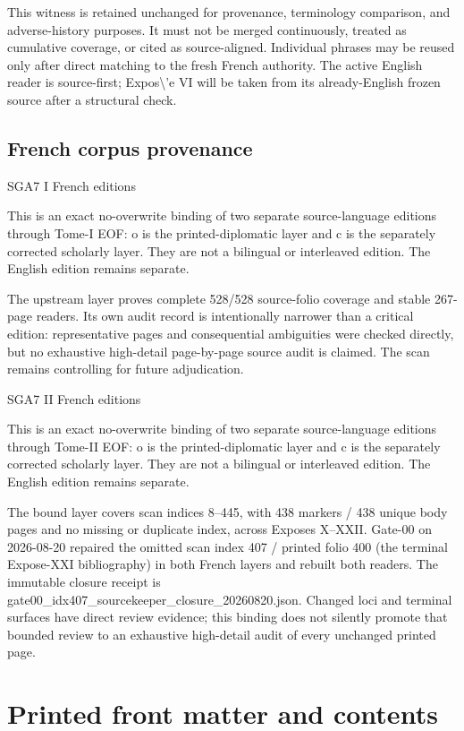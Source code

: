 This witness is retained unchanged for provenance, terminology comparison, and adverse-history purposes. It must not be merged continuously, treated as cumulative coverage, or cited as source-aligned. Individual phrases may be reused only after direct matching to the fresh French authority. The active English reader is source-first; Expos\textbackslash{}'e VI will be taken from its already-English frozen source after a structural check.


\subsection*{French corpus provenance}

SGA7 I French editions

This is an exact no-overwrite binding of two separate source-language editions through Tome-I EOF: o is the printed-diplomatic layer and c is the separately corrected scholarly layer. They are not a bilingual or interleaved edition. The English edition remains separate.

The upstream layer proves complete 528/528 source-folio coverage and stable 267-page readers. Its own audit record is intentionally narrower than a critical edition: representative pages and consequential ambiguities were checked directly, but no exhaustive high-detail page-by-page source audit is claimed. The scan remains controlling for future adjudication.


SGA7 II French editions

This is an exact no-overwrite binding of two separate source-language editions through Tome-II EOF: o is the printed-diplomatic layer and c is the separately corrected scholarly layer. They are not a bilingual or interleaved edition. The English edition remains separate.

The bound layer covers scan indices 8--445, with 438 markers / 438 unique body pages and no missing or duplicate index, across Exposes X--XXII. Gate-00 on 2026-08-20 repaired the omitted scan index 407 / printed folio 400 (the terminal Expose-XXI bibliography) in both French layers and rebuilt both readers. The immutable closure receipt is gate00\_idx407\_sourcekeeper\_closure\_20260820.json. Changed loci and terminal surfaces have direct review evidence; this binding does not silently promote that bounded review to an exhaustive high-detail audit of every unchanged printed page.


\section*{Printed front matter and contents}

